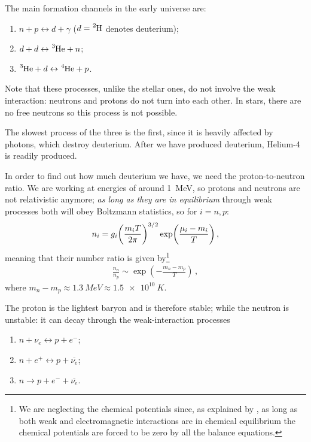 \documentclass[main.tex]{subfiles}
\begin{document}

The main formation channels in the early universe are: 
%
\begin{enumerate}
    \item \(n+p \leftrightarrow d + \gamma \) (\(d= \ce{^{2}H}\) denotes deuterium);
    \item \(d + d \leftrightarrow \ce{^{3}He} + n\);
    \item \(\ce{^{3}He} + d \leftrightarrow \ce{^{4}He} + p\).
\end{enumerate}

Note that these processes, unlike the stellar ones, do not involve the weak interaction: neutrons and protons do not turn into each other.
In stars, there are no free neutrons so this process is not possible.

The slowest process of the three is the first, since it is heavily affected by photons, which destroy deuterium.
After we have produced deuterium, Helium-4 is readily produced.


In order to find out how much deuterium we have, we need the proton-to-neutron ratio. 
We are working at energies of around \SI{1}{MeV}, so protons and neutrons are not relativistic anymore; \emph{as long as they are in equilibrium} through weak processes both will obey Boltzmann statistics, so for \(i = n, p\): 
%
\begin{align}
  n_i = g_{i} \qty(\frac{m_i T}{2 \pi })^{3/2} \exp(\frac{\mu_i - m_i}{T})
\,,
\end{align}
%
meaning that their number ratio is given by\footnote{We are neglecting the chemical potentials since, as explained by \textcite[sec.\ 8.6.2]{LucchinColes:2002}, as long as both weak and electromagnetic interactions are in chemical equilibrium the chemical potentials are forced to be zero by all the balance equations.}
%
\begin{align}
  \frac{n_n}{n_p} \sim \exp(-\frac{m_n - m_p}{T})
\,,
\end{align}
%
where \(m_n - m_p \approx \SI{1.3}{MeV} \approx \SI{1.5e10}{K}\).

The proton is the lightest baryon and is therefore stable; while the neutron is unstable: it can decay through the weak-interaction processes 
\begin{enumerate}
    \item \(n + \nu _e \leftrightarrow p + e^{-}\);
    \item \(n + e^{+} \leftrightarrow p + \overline{\nu _e} \);
    \item \(n \rightarrow p + e^{-} + \overline{\nu _e} \).
\end{enumerate}
\end{document}
